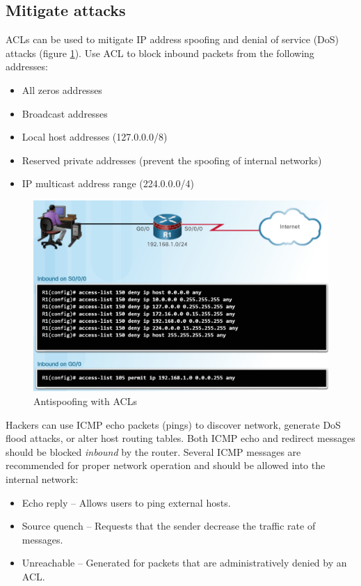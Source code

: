 \subsection{Mitigate attacks}

ACLs can be used to mitigate IP address spoofing and denial of service (DoS) attacks (figure \ref{AntispoofingACL}). Use ACL to block inbound packets from the following addresses:

\begin{itemize}
\item All zeros addresses
\item Broadcast addresses
\item Local host addresses (127.0.0.0/8)
\item Reserved private addresses (prevent the spoofing of internal networks)
\item IP multicast address range (224.0.0.0/4)
\end{itemize}

\begin{figure}[hbtp]
  \caption{Antispoofing with ACLs}\label{AntispoofingACL}
  \centering
  \includegraphics[scale=0.5]{pictures/AntispoofingACL.PNG}
  \end{figure}

Hackers can use ICMP echo packets (pings) to discover network, generate DoS flood attacks, or alter host routing tables. Both ICMP echo and redirect messages should be blocked \emph{inbound} by the router. Several ICMP messages are recommended for proper network operation and should be allowed into the internal network:

\begin{itemize}
\item Echo reply -- Allows users to ping external hosts.
\item Source quench -- Requests that the sender decrease the traffic rate of messages.
\item Unreachable -- Generated for packets that are administratively denied by an ACL.
\end{itemize}

